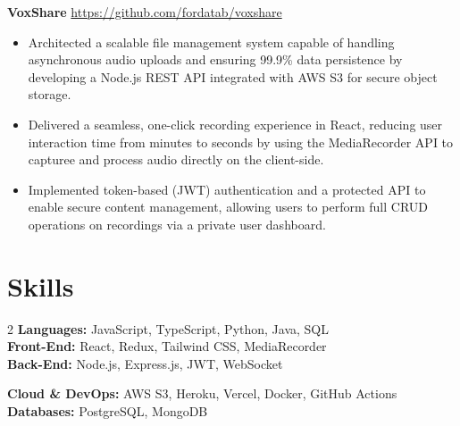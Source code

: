 \documentclass[11pt]{article}       %
\begin{document}
\textbf{VoxShare} \hfill \href{https://github.com/fordatab/voxshare}{https://github.com/fordatab/voxshare} \
\vspace{-10pt}
\begin{itemize}
\item Architected a scalable file management system capable of handling asynchronous audio uploads and ensuring 99.9\% data persistence by developing a Node.js REST API integrated with AWS S3 for secure object storage.
\item Delivered a seamless, one-click recording experience in React, reducing user interaction time from minutes to seconds by using the MediaRecorder API to capturee and process audio directly on the client-side.
\item Implemented token-based (JWT) authentication and a protected API to enable secure content management, allowing users to perform full CRUD operations on recordings via a private user dashboard.
\end{itemize}


\vspace{-18.5pt}

\section*{Skills}
\noindent\begin{minipage}{\textwidth}


\begin{multicols}{2}
    \noindent\textbf{Languages:} JavaScript, TypeScript, Python, Java, SQL \\
    \textbf{Front-End:} React, Redux, Tailwind CSS, MediaRecorder  \\
    \textbf{Back-End:} Node.js, Express.js, JWT, WebSocket
    
    \columnbreak %
    
    \noindent\textbf{Cloud \& DevOps:} AWS S3, Heroku, Vercel, Docker, GitHub Actions \\
    \textbf{Databases:} PostgreSQL, MongoDB
\end{multicols}
\end{minipage}
\end{document}
